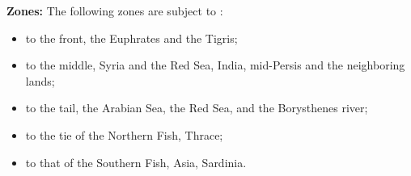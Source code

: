 \textbf{Zones:} The following zones are subject to \Pisces: 
\begin{itemize}
\item to the front, the Euphrates and the Tigris; 
\item to the middle, Syria and the Red Sea, India, mid-Persis and the neighboring lands; 
\item to the tail, the Arabian Sea, the Red Sea, and the Borysthenes river; 
\item to the tie of the Northern Fish, Thrace; 
\item to that of the Southern Fish, Asia, Sardinia.
\end{itemize}

\newpage